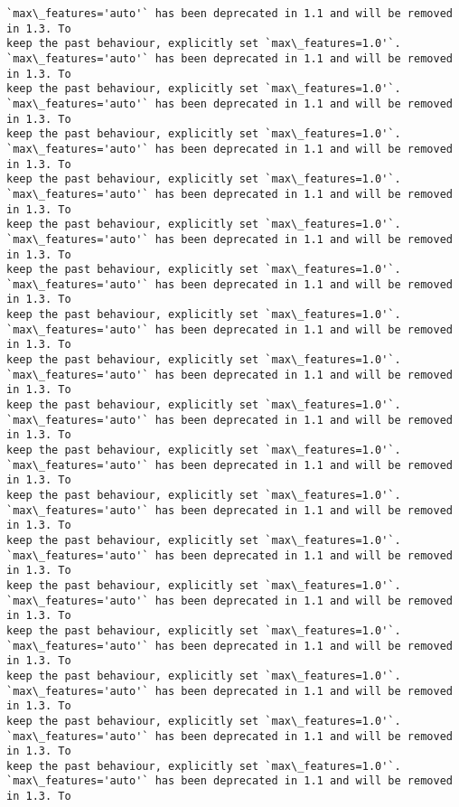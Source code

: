 \documentclass[11pt]{article}
\begin{document}
    \begin{Verbatim}[commandchars=\\\{\}]
`max\_features='auto'` has been deprecated in 1.1 and will be removed in 1.3. To
keep the past behaviour, explicitly set `max\_features=1.0'`.
`max\_features='auto'` has been deprecated in 1.1 and will be removed in 1.3. To
keep the past behaviour, explicitly set `max\_features=1.0'`.
`max\_features='auto'` has been deprecated in 1.1 and will be removed in 1.3. To
keep the past behaviour, explicitly set `max\_features=1.0'`.
`max\_features='auto'` has been deprecated in 1.1 and will be removed in 1.3. To
keep the past behaviour, explicitly set `max\_features=1.0'`.
`max\_features='auto'` has been deprecated in 1.1 and will be removed in 1.3. To
keep the past behaviour, explicitly set `max\_features=1.0'`.
`max\_features='auto'` has been deprecated in 1.1 and will be removed in 1.3. To
keep the past behaviour, explicitly set `max\_features=1.0'`.
`max\_features='auto'` has been deprecated in 1.1 and will be removed in 1.3. To
keep the past behaviour, explicitly set `max\_features=1.0'`.
`max\_features='auto'` has been deprecated in 1.1 and will be removed in 1.3. To
keep the past behaviour, explicitly set `max\_features=1.0'`.
`max\_features='auto'` has been deprecated in 1.1 and will be removed in 1.3. To
keep the past behaviour, explicitly set `max\_features=1.0'`.
`max\_features='auto'` has been deprecated in 1.1 and will be removed in 1.3. To
keep the past behaviour, explicitly set `max\_features=1.0'`.
`max\_features='auto'` has been deprecated in 1.1 and will be removed in 1.3. To
keep the past behaviour, explicitly set `max\_features=1.0'`.
`max\_features='auto'` has been deprecated in 1.1 and will be removed in 1.3. To
keep the past behaviour, explicitly set `max\_features=1.0'`.
`max\_features='auto'` has been deprecated in 1.1 and will be removed in 1.3. To
keep the past behaviour, explicitly set `max\_features=1.0'`.
`max\_features='auto'` has been deprecated in 1.1 and will be removed in 1.3. To
keep the past behaviour, explicitly set `max\_features=1.0'`.
`max\_features='auto'` has been deprecated in 1.1 and will be removed in 1.3. To
keep the past behaviour, explicitly set `max\_features=1.0'`.
`max\_features='auto'` has been deprecated in 1.1 and will be removed in 1.3. To
keep the past behaviour, explicitly set `max\_features=1.0'`.
`max\_features='auto'` has been deprecated in 1.1 and will be removed in 1.3. To
keep the past behaviour, explicitly set `max\_features=1.0'`.
`max\_features='auto'` has been deprecated in 1.1 and will be removed in 1.3. To

\end{Verbatim}
\end{document}
